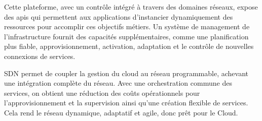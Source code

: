 Cette plateforme, avec un contrôle intégré à travers des domaines réseaux, expose des \glspl{api} qui permettent aux applications d'instancier dynamiquement des ressources pour accomplir ces objectifs métiers. Un  système de management de l'infrastructure fournit des capacités supplémentaires, comme une planification plus fiable, approvisionnement, activation, adaptation et le contrôle de nouvelles connexions de services.

SDN permet de coupler la gestion du cloud au réseau programmable, achevant une intégration complète du réseau. Avec une orchestration commune des services, on obtient une réduction des coûts opérationnels pour l'approvisionnement et la supervision ainsi qu'une création flexible de services. Cela rend le réseau dynamique, adaptatif et agile, donc prêt pour le Cloud. \cite{OFSDNNFVand} \cite{realTimeCloudNetworkEnabled} 

